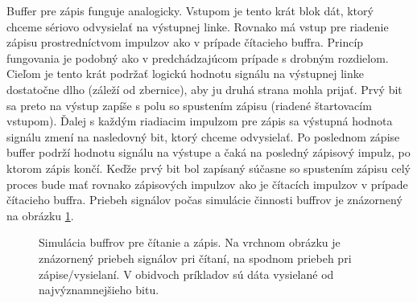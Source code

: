Buffer pre zápis funguje analogicky. Vstupom je tento krát blok dát, ktorý chceme sériovo odvysielať na výstupnej linke. Rovnako má vstup pre riadenie zápisu prostredníctvom impulzov ako v prípade čítacieho buffra. Princíp fungovania je podobný ako v predchádzajúcom prípade s drobným rozdielom. Cieľom je tento krát podržať logickú hodnotu signálu na výstupnej linke dostatočne dlho (záleží od zbernice), aby ju druhá strana mohla prijať. Prvý bit sa preto na výstup zapíše s polu so spustením zápisu (riadené štartovacím vstupom). Ďalej s každým riadiacim impulzom pre zápis sa výstupná hodnota signálu zmení na nasledovný bit, ktorý chceme odvysielať. Po poslednom zápise buffer podrží hodnotu signálu na výstupe a čaká na posledný zápisový impulz, po ktorom zápis končí. Keďže prvý bit bol zapísaný súčasne so spustením zápisu celý proces bude mať rovnako zápisových impulzov ako je čítacích impulzov v prípade čítacieho buffra. Priebeh signálov počas simulácie činnosti buffrov je znázornený na obrázku \ref{obr:bufferSim}.

\begin{figure}
    \centering
    \vfill
    \caption[Simulácia buffrov pre čítanie a zápis]{Simulácia buffrov pre čítanie a zápis. Na vrchnom obrázku je znázornený priebeh signálov pri čítaní, na spodnom priebeh pri zápise/vysielaní. V obidvoch príkladov sú dáta vysielané od najvýznamnejšieho bitu.}
    \label{obr:bufferSim}
\end{figure}

